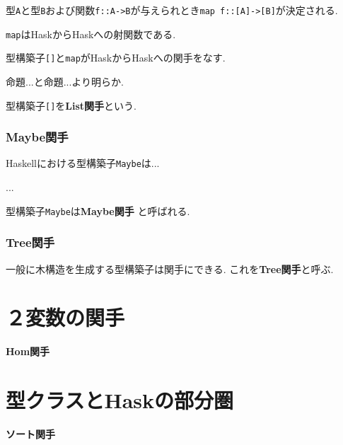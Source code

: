 型\verb|A|と型\verb|B|および関数\verb|f::A->B|が与えられとき\verb|map f::[A]->[B]|が決定される.
\begin{Prop}
\verb|map|はHaskからHaskへの射関数である.
\end{Prop}
\begin{Prop}
型構築子\verb|[]|と\verb|map|がHaskからHaskへの関手をなす.
\end{Prop}
\begin{Proof}
命題...と命題...より明らか.
\end{Proof}
型構築子\verb|[]|を{\bf List関手}という.
\subsubsection{Maybe関手}
Haskellにおける型構築子\verb|Maybe|は...

...

型構築子\verb|Maybe|は{\bf Maybe関手}
と呼ばれる.
\subsubsection{Tree関手}
一般に木構造を生成する型構築子は関手にできる. これを{\bf Tree関手}と呼ぶ.


\section{２変数の関手}
{\bf Hom関手}

\section{型クラスとHaskの部分圏}
{\bf ソート関手}


